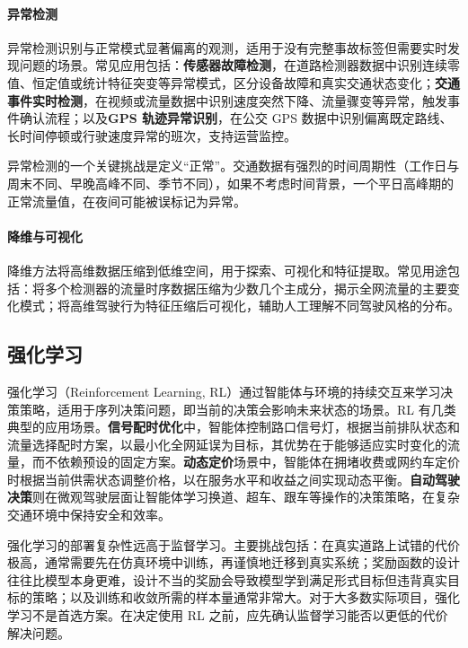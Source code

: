 \paragraph{异常检测}

异常检测识别与正常模式显著偏离的观测，适用于没有完整事故标签但需要实时发现问题的场景。常见应用包括：\textbf{传感器故障检测}，在道路检测器数据中识别连续零值、恒定值或统计特征突变等异常模式，区分设备故障和真实交通状态变化；\textbf{交通事件实时检测}，在视频或流量数据中识别速度突然下降、流量骤变等异常，触发事件确认流程；以及\textbf{GPS 轨迹异常识别}，在公交 GPS 数据中识别偏离既定路线、长时间停顿或行驶速度异常的班次，支持运营监控。

异常检测的一个关键挑战是定义“正常”。交通数据有强烈的时间周期性（工作日与周末不同、早晚高峰不同、季节不同），如果不考虑时间背景，一个平日高峰期的正常流量值，在夜间可能被误标记为异常。

\paragraph{降维与可视化}

降维方法将高维数据压缩到低维空间，用于探索、可视化和特征提取。常见用途包括：将多个检测器的流量时序数据压缩为少数几个主成分，揭示全网流量的主要变化模式；将高维驾驶行为特征压缩后可视化，辅助人工理解不同驾驶风格的分布。

\subsection{强化学习}

强化学习（Reinforcement Learning, RL）通过智能体与环境的持续交互来学习决策策略，适用于序列决策问题，即当前的决策会影响未来状态的场景。RL 有几类典型的应用场景。\textbf{信号配时优化}中，智能体控制路口信号灯，根据当前排队状态和流量选择配时方案，以最小化全网延误为目标，其优势在于能够适应实时变化的流量，而不依赖预设的固定方案。\textbf{动态定价}场景中，智能体在拥堵收费或网约车定价时根据当前供需状态调整价格，以在服务水平和收益之间实现动态平衡。\textbf{自动驾驶决策}则在微观驾驶层面让智能体学习换道、超车、跟车等操作的决策策略，在复杂交通环境中保持安全和效率。

强化学习的部署复杂性远高于监督学习。主要挑战包括：在真实道路上试错的代价极高，通常需要先在仿真环境中训练，再谨慎地迁移到真实系统；奖励函数的设计往往比模型本身更难，设计不当的奖励会导致模型学到满足形式目标但违背真实目标的策略；以及训练和收敛所需的样本量通常非常大。对于大多数实际项目，强化学习不是首选方案。在决定使用 RL 之前，应先确认监督学习能否以更低的代价解决问题。

